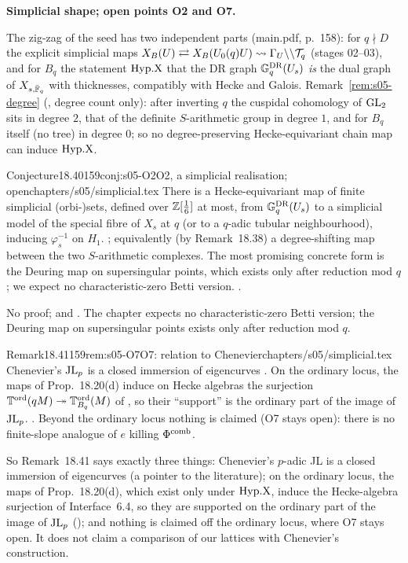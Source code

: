 \medskip\noindent\textbf{Simplicial shape; open points O2 and O7.}\par
{}\label{rpt:ss:s05-simplicial}The zig-zag of the seed has two independent parts (main.pdf, p.~158): for $q\nmid D$ the explicit simplicial maps
$X_B(U)\rightleftarrows X_B(U_0(q)U)\leadsto\Gamma_U\backslash\backslash\mathcal{T}_q$ (stages 02--03), and for $B_q$ the statement $\mathrm{Hyp.X}$ that the DR graph
$\mathbb{G}^{\mathrm{DR}}_q(U_s)$ \emph{is} the dual graph of $X_{s,\bar{\mathbb{F}}_q}$ with thicknesses, compatibly with Hecke and Galois. Remark~\ref{rem:s05-degree} (\stsketch,
degree count only): after inverting $q$ the cuspidal cohomology of $\mathrm{GL}_2$ sits in degree $2$, that of the definite $S$-arithmetic group in
degree $1$, and for $B_q$ itself (no tree) in degree $0$; so no degree-preserving Hecke-equivariant chain map can induce $\mathrm{Hyp.X}$.
\begin{quoted}{Conjecture}{18.40}{159}{conj:s05-O2}{O2, a simplicial realisation; open}{chapters/s05/simplicial.tex}\label{rpt:conj:s05-O2}
There is a Hecke-equivariant map of finite simplicial (orbi-)sets, defined over $\mathbb{Z}[\frac1{6}]$ at most, from $\mathbb{G}^{\mathrm{DR}}_q(U_s)$ to a simplicial
model of the special fibre of $X_s$ at $q$ (or to a $q$-adic tubular neighbourhood), inducing $\varphi_s^{-1}$ on $H_1$. \stconj{};
equivalently (by Remark~18.38) a degree-shifting map between the two $S$-arithmetic complexes. The most promising concrete
form is the Deuring map on supersingular points, which exists only after reduction mod $q$; we expect no characteristic-zero Betti
version. \stopen.
\end{quoted}
\begin{outline}
No proof; \stconj{} and \stopen. The chapter expects no characteristic-zero Betti version; the Deuring map on supersingular points exists
only after reduction mod $q$.
\end{outline}
\begin{quoted}{Remark}{18.41}{159}{rem:s05-O7}{O7: relation to Chenevier}{chapters/s05/simplicial.tex}\label{rpt:rem:s05-O7}
Chenevier's $\mathrm{JL}_p$ is a closed immersion of eigencurves
\cite[{\S4.6, Thm.~3, p.~188}]{Ch}. On the ordinary locus, the maps of
Prop.~18.20(d) induce on Hecke algebras the surjection $\mathbb{T}^{\mathrm{ord}}(qM)\twoheadrightarrow\mathbb{T}^{\mathrm{ord}}_{B_q}(M)$ of
, so their ``support'' is the ordinary part of the image of $\mathrm{JL}_p$. \stsketch. Beyond the ordinary locus nothing
is claimed (O7 stays open): there is no finite-slope analogue of $e$ killing $\Phi^{\mathrm{comb}}$.
\end{quoted}
\noindent So Remark~18.41 says exactly three things: Chenevier's $p$-adic JL is a closed immersion of eigencurves (a pointer to the literature); on the ordinary
locus, the maps of Prop.~18.20(d), which exist only under $\mathrm{Hyp.X}$, induce the Hecke-algebra surjection of Interface~6.4, so they are
supported on the ordinary part of the image of $\mathrm{JL}_p$ (\stsketch); and nothing is claimed off the ordinary locus, where O7 stays open.
It does not claim a comparison of our lattices with Chenevier's construction.

